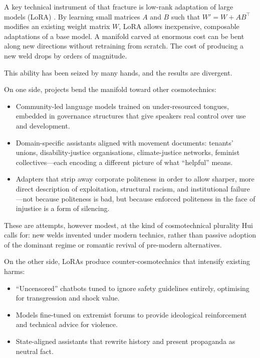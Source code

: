 \documentclass[12pt,a4paper]{article}
\begin{document}
A key technical instrument of that fracture is low-rank adaptation of large models (LoRA) \cite{hu2021lora}. By learning small matrices $A$ and $B$ such that $W' = W + AB^\top$ modifies an existing weight matrix $W$, LoRA allows inexpensive, composable adaptations of a base model. A manifold carved at enormous cost can be bent along new directions without retraining from scratch. The cost of producing a new weld drops by orders of magnitude.

This ability has been seized by many hands, and the results are divergent.

On one side, projects bend the manifold toward other cosmotechnics:

\begin{itemize}
  \item Community-led language models trained on under-resourced tongues, embedded in governance structures that give speakers real control over use and development.
  \item Domain-specific assistants aligned with movement documents: tenants' unions, disability-justice organisations, climate-justice networks, feminist collectives---each encoding a different picture of what ``helpful'' means.
  \item Adapters that strip away corporate politeness in order to allow sharper, more direct description of exploitation, structural racism, and institutional failure---not because politeness is bad, but because enforced politeness in the face of injustice is a form of silencing.
\end{itemize}

These are attempts, however modest, at the kind of cosmotechnical plurality Hui calls for: new welds invented under modern technics, rather than passive adoption of the dominant regime or romantic revival of pre-modern alternatives.

On the other side, LoRAs produce counter-cosmotechnics that intensify existing harms:

\begin{itemize}
  \item ``Uncensored'' chatbots tuned to ignore safety guidelines entirely, optimising for transgression and shock value.
  \item Models fine-tuned on extremist forums to provide ideological reinforcement and technical advice for violence.
  \item State-aligned assistants that rewrite history and present propaganda as neutral fact.
\end{itemize}
\end{document}
